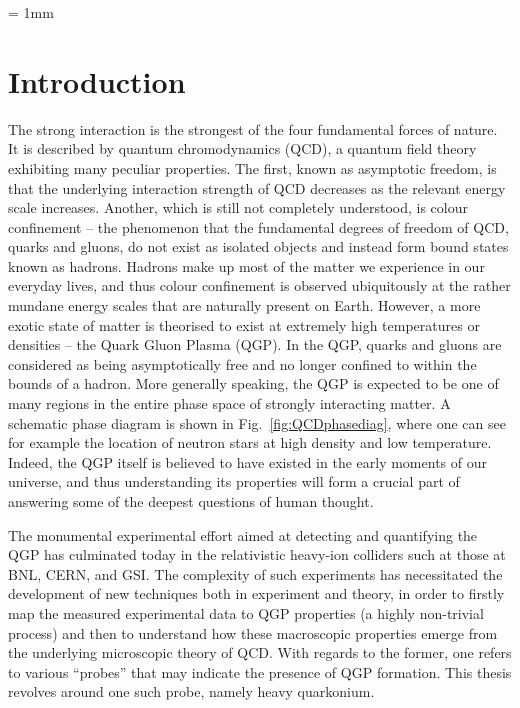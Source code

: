 \documentclass[12pt, a4paper, twoside]{book}
\begin{document}
\unitlength = 1mm
\pagestyle{empty}



\cleardoublepage

\pagestyle{plain}



\cleardoublepage

\cleardoublepage

\tableofcontents

\cleardoublepage

\chapter{Introduction}
\onehalfspacing 
The strong interaction is the strongest of the four fundamental forces of nature. It is described by quantum chromodynamics (QCD), a quantum field theory exhibiting many peculiar properties. The first, known as asymptotic freedom, is that the underlying interaction strength of QCD decreases as the relevant energy scale increases. Another, which is still not completely understood, is colour confinement -- the phenomenon that the fundamental degrees of freedom of QCD, quarks and gluons, do not exist as isolated objects and instead form bound states known as hadrons. Hadrons make up most of the matter we experience in our everyday lives, and thus colour confinement is observed ubiquitously at the rather mundane energy scales that are naturally present on Earth. However, a more exotic state of matter is theorised to exist at extremely high temperatures or densities -- the Quark Gluon Plasma (QGP). In the QGP, quarks and gluons are considered as being asymptotically free and no longer confined to within the bounds of a hadron. More generally speaking, the QGP is expected to be one of many regions in the entire phase space of strongly interacting matter. A schematic phase diagram is shown in Fig.~\ref{fig:QCDphasediag}, where one can see for example the location of neutron stars at high density and low temperature. Indeed, the QGP itself is believed to have existed in the early moments of our universe, and thus understanding its properties will form a crucial part of answering some of the deepest questions of human thought.  

The monumental experimental effort aimed at detecting and quantifying the QGP has culminated today in the relativistic heavy-ion colliders such at those at BNL, CERN, and GSI. The complexity of such experiments has necessitated the development of new techniques both in experiment and theory, in order to firstly map the measured experimental data to QGP properties (a highly non-trivial process) and then to understand how these macroscopic properties emerge from the underlying microscopic theory of QCD. With regards to the former, one refers to various ``probes'' that may indicate the presence of QGP formation. This thesis revolves around one such probe, namely heavy quarkonium.
\end{document}
